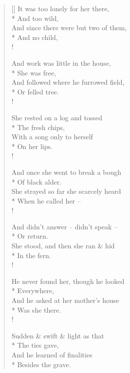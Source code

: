 \documentclass[MAIN]{subfiles}
\begin{document}
\settowidth{\versewidth}{And since there were but two of them,}
\begin{verse}[\versewidth]
It was too lonely for her there,\\*
\vin And too wild,\\
And since there were but two of them,\\*
\vin And no child,\\!

And work was little in the house,\\*
\vin She was free,\\
And followed where he furrowed field,\\*
\vin Or felled tree.\\!

She rested on a log and tossed\\*
\vin The fresh chips,\\
With a song only to herself\\*
\vin On her lips.\\!

And once she went to break a bough\\*
\vin Of black alder.\\
She strayed so far she scarcely heard\\*
\vin When he called her --\\!

And didn't answer -- didn't speak --\\*
\vin Or return.\\
She stood, and then she ran \& hid\\*
\vin In the fern.\\!

He never found her, though he looked\\*
\vin Everywhere,\\
And he asked at her mother's house\\*
\vin Was she there.\\!

Sudden \& swift \& light as that\\*
\vin The ties gave,\\
And he learned of finalities\\*
\vin Besides the grave.
\end{verse}
\end{document}
